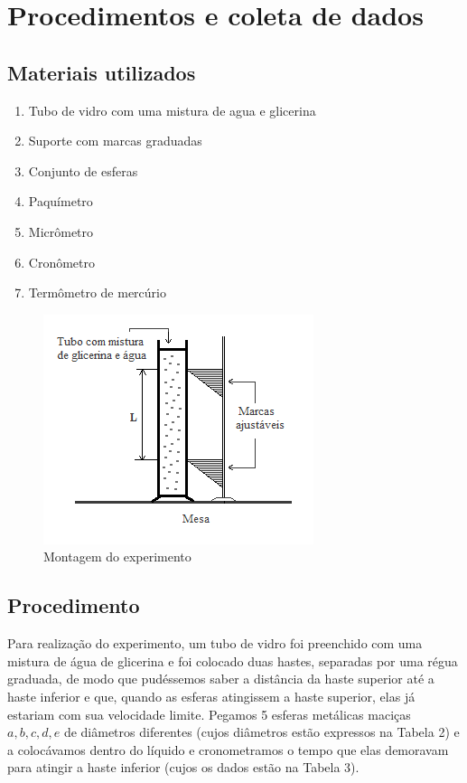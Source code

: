 \documentclass[english,brazil]{article}
\begin{document}
\section{Procedimentos e coleta de dados}


	\subsection{Materiais utilizados}
		\begin{enumerate}
			\item Tubo de vidro com uma mistura de agua e glicerina 
			\item Suporte com marcas graduadas 
			\item Conjunto de esferas 
			\item Paquímetro 
			\item Micrômetro 
			\item Cronômetro 
			\item Termômetro de mercúrio 
		\end{enumerate}

	\begin{figure}[!ht]
		\centering
		\includegraphics[scale=0.8]{arranjo-experimental.png}
		\caption{Montagem do experimento}
	\end{figure}

	\subsection{Procedimento}

		Para realização do experimento, um tubo de vidro foi preenchido com uma mistura de água de glicerina e foi colocado duas hastes, separadas por uma régua graduada, de modo que pudéssemos saber a distância da haste superior até a haste inferior e que, quando as esferas atingissem a haste superior, elas já estariam com sua velocidade limite. Pegamos 5 esferas metálicas maciças $a,b,c,d,e$ de diâmetros diferentes (cujos diâmetros estão expressos na Tabela 2) e a colocávamos dentro do líquido e cronometramos o tempo que elas demoravam para atingir a haste inferior (cujos os dados estão na Tabela 3).
		
\end{document}
